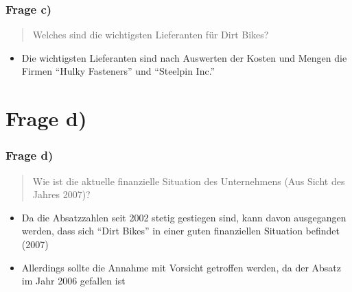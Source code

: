\documentclass{beamer}
\begin{document}
\begin{frame}
\frametitle{Frage c)}

\begin{quote}
Welches sind die wichtigsten Lieferanten für Dirt Bikes?
\end{quote}

\begin{itemize}
\setlength{\itemsep}{14pt}
\item Die wichtigsten Lieferanten sind nach Auswerten der Kosten und Mengen die Firmen ``Hulky Fasteners'' und ``Steelpin Inc.''
\end{itemize}

\end{frame}

\section{Frage d)}
\begin{frame}
\frametitle{Frage d)}

\begin{quote}
Wie ist die aktuelle finanzielle Situation des Unternehmens (Aus Sicht des Jahres 2007)?
\end{quote}

\begin{itemize}
\setlength{\itemsep}{14pt}
\item Da die Absatzzahlen seit 2002 stetig gestiegen sind, kann davon ausgegangen werden,
dass sich ``Dirt Bikes'' in einer guten finanziellen Situation befindet (2007)
\item Allerdings sollte die Annahme mit Vorsicht getroffen werden, da der Absatz im Jahr 2006
gefallen ist
\end{itemize}

\end{frame}
\end{document}
